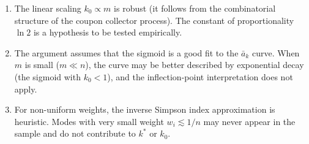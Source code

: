\begin{enumerate}
    \item The linear scaling $k_0 \propto m$ is robust (it follows from the combinatorial structure of the coupon collector process).
The constant of proportionality $\ln 2$ is a hypothesis to be tested empirically.

    \item The argument assumes that the sigmoid is a good fit to the $\bar{a}_k$ curve.
When $m$ is small ($m \ll n$), the curve may be better described by exponential decay (the sigmoid with $k_0 < 1$), and the inflection-point interpretation does not apply.

    \item For non-uniform weights, the inverse Simpson index approximation is heuristic.
Modes with very small weight $w_i \lesssim 1/n$ may never appear in the sample and do not contribute to $k^*$ or $k_0$.
\end{enumerate}

